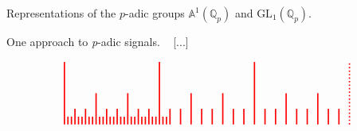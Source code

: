 \documentclass[letterpaper,11pt, reqno]{amsart}
\newtheorem{monodromy theorem}{Monodromy Theorem}[subsection]
\newtheorem{wild conjecture}[theorem]{Wild Conjecture}
\newtheorem{research objectives}{Research objectives}[subsection]
\newtheorem{research question}[theorem]{Research questions}
\newtheorem{aside question}[theorem]{Aside question}
\newtheorem{audio example}[theorem]{\loudspeaker[3] Example}
\newtheorem{blank remark}[theorem]{}
\newtheorem{terminology and comment}[theorem]{Terminology and comment}
\newtheorem{purity hypothesis}[theorem]{Purity hypothesis}
\newtheorem{corollary of the purity hypothesis}[theorem]{Corollary of the purity hypothesis}
\numberwithin{equation}{theorem}
\begin{document}
\begin{section}{Representations of the $p$-adic groups $\mathbb{A}^{\!1}(\mathbb{Q}_{p})$ and $\text{GL}_{1}(\mathbb{Q}_{p})$.}
\begin{subsection}{One approach to {\em p}-adic signals.}
\ 
{\color{red} [...]}
	\begin{figure}[ht]
	$$
	\begin{tikzpicture}
	\draw[red, very thick] (0,0) -- (0,2);
	\draw[red, very thick] (3,0) -- (3,2);
	\draw[red, very thick] (6,0) -- (6,2);
	\draw[red, very thick, dotted] (9,0) -- (9,2);
	\draw[red, very thick] (1,0) -- (1,1);
	\draw[red, very thick] (2,0) -- (2,1);
	\draw[red, very thick] (4,0) -- (4,1);
	\draw[red, very thick] (5,0) -- (5,1);
	\draw[red, very thick] (7,0) -- (7,1);
	\draw[red, very thick] (8,0) -- (8,1);
	\draw[red, very thick] (1/3,0) -- (1/3,.5);
	\draw[red, very thick] (2/3,0) -- (2/3,.5);
	\draw[red, very thick] (1+1/3,0) -- (1+1/3,.5);
	\draw[red, very thick] (1+2/3,0) -- (1+2/3,.5);
	\draw[red, very thick] (2+1/3,0) -- (2+1/3,.5);
	\draw[red, very thick] (2+2/3,0) -- (2+2/3,.5);
	\draw[red, very thick] (3+1/3,0) -- (3+1/3,.5);
	\draw[red, very thick] (3+2/3,0) -- (3+2/3,.5);
	\draw[red, very thick] (4+1/3,0) -- (4+1/3,.5);
	\draw[red, very thick] (4+2/3,0) -- (4+2/3,.5);
	\draw[red, very thick] (5+1/3,0) -- (5+1/3,.5);
	\draw[red, very thick] (5+2/3,0) -- (5+2/3,.5);
	\draw[red, very thick] (6+1/3,0) -- (6+1/3,.5);
	\draw[red, very thick] (6+2/3,0) -- (6+2/3,.5);
	\draw[red, very thick] (7+1/3,0) -- (7+1/3,.5);
	\draw[red, very thick] (7+2/3,0) -- (7+2/3,.5);
	\draw[red, very thick] (8+1/3,0) -- (8+1/3,.5);
	\draw[red, very thick] (8+2/3,0) -- (8+2/3,.5);
	\draw[red, very thick] (1/9,0) -- (1/9,.25);
	\draw[red, very thick] (2/9,0) -- (2/9,.25);
	\draw[red, very thick] (1/3+1/9,0) -- (1/3+1/9,.25);
	\draw[red, very thick] (1/3+2/9,0) -- (1/3+2/9,.25);
	\draw[red, very thick] (2/3+1/9,0) -- (2/3+1/9,.25);
	\draw[red, very thick] (2/3+2/9,0) -- (2/3+2/9,.25);
	\draw[red, very thick] (3/3+1/9,0) -- (3/3+1/9,.25);
	\draw[red, very thick] (3/3+2/9,0) -- (3/3+2/9,.25);
	\draw[red, very thick] (4/3+1/9,0) -- (4/3+1/9,.25);
	\draw[red, very thick] (4/3+2/9,0) -- (4/3+2/9,.25);
	\draw[red, very thick] (5/3+1/9,0) -- (5/3+1/9,.25);
	\draw[red, very thick] (5/3+2/9,0) -- (5/3+2/9,.25);
	\draw[red, very thick] (6/3+1/9,0) -- (6/3+1/9,.25);
	\draw[red, very thick] (6/3+2/9,0) -- (6/3+2/9,.25);
	\draw[red, very thick] (7/3+1/9,0) -- (7/3+1/9,.25);
	\draw[red, very thick] (7/3+2/9,0) -- (7/3+2/9,.25);
	\draw[red, very thick] (8/3+1/9,0) -- (8/3+1/9,.25);
	\draw[red, very thick] (8/3+2/9,0) -- (8/3+2/9,.25);
	\draw[red, very thick] (9/3+1/9,0) -- (9/3+1/9,.25);
	\draw[red, very thick] (9/3+2/9,0) -- (9/3+2/9,.25);

\end{tikzpicture}$$
\end{figure}
\end{subsection}
\end{section}
\end{document}

